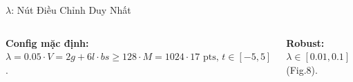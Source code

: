 \documentclass[aspectratio=169,9pt]{beamer}
\begin{document}
\begin{frame}{$\lambda$: Nút Điều Chỉnh Duy Nhất}
\begin{columns}[T]
\vspace{0.3em}

\begin{primarybox}
\footnotesize \textbf{Config mặc định:} $\lambda=0.05 \cdot V=2g+6l \cdot bs \geq 128 \cdot M=1024 \cdot 17\text{ pts, } t\in[-5,5]$.
\end{primarybox}

\vspace{1.5em}
\begin{goodbox}
\footnotesize \textbf{Robust:} $\lambda \in [0.01, 0.1]$ (Fig.8).
\end{goodbox}

\end{columns}
\end{frame}
\fi %
\end{document}
